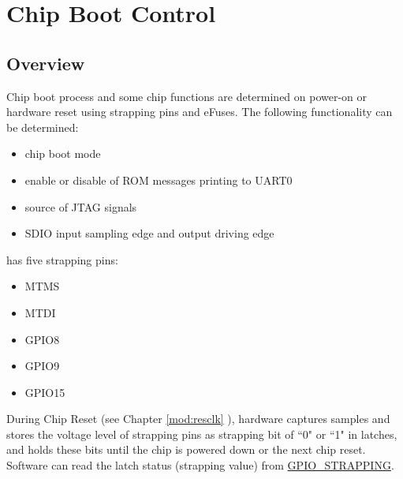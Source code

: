 \documentclass[main\_\_EN.tex]{subfiles}
\begin{document}

\ifglobal
\else
    {\let\clearpage\relax \listoftodos}
    {\let\clearpage\relax \listofdonetodos}
    \tableofcontents
\fi



\hypertarget{bootctrl}{}
\chapter{Chip Boot Control}
\label{mod:bootctrl}


\section{Overview}

Chip boot process and some chip functions are determined on power-on or hardware reset using strapping pins and eFuses. The following functionality can be determined:
\begin{itemize}
    \item chip boot mode
    \item enable or disable of ROM messages printing to UART0
    \item source of JTAG signals
    \item SDIO input sampling edge and output driving edge

\end{itemize}

\chipname{} has five strapping pins:
\begin{itemize}
    \item MTMS
    \item MTDI
    \item GPIO8
    \item GPIO9
    \item GPIO15
\end{itemize}


During Chip Reset (see Chapter \ref{mod:resclk} \textit{}), hardware captures samples and stores the voltage level of strapping pins as strapping bit of ``0" or ``1" in latches, and holds these bits until the chip is powered down or the next chip reset. Software can read the latch status (strapping value) from \hyperref[fielddesc:GPIOSTRAPPING]{GPIO\_STRAPPING}.
\end{document}

